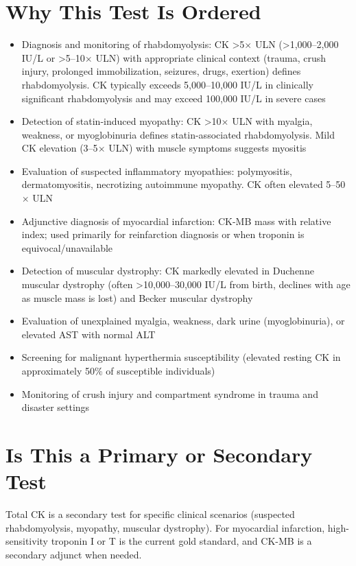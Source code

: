 \section*{Why This Test Is Ordered}
\begin{itemize}
  \item Diagnosis and monitoring of rhabdomyolysis: CK >5$\times$ ULN (>1,000--2,000 IU/L or >5--10$\times$ ULN) with appropriate clinical context (trauma, crush injury, prolonged immobilization, seizures, drugs, exertion) defines rhabdomyolysis. CK typically exceeds 5,000--10,000 IU/L in clinically significant rhabdomyolysis and may exceed 100,000 IU/L in severe cases
  \item Detection of statin-induced myopathy: CK >10$\times$ ULN with myalgia, weakness, or myoglobinuria defines statin-associated rhabdomyolysis. Mild CK elevation (3--5$\times$ ULN) with muscle symptoms suggests myositis
  \item Evaluation of suspected inflammatory myopathies: polymyositis, dermatomyositis, necrotizing autoimmune myopathy. CK often elevated 5--50$\times$ ULN
  \item Adjunctive diagnosis of myocardial infarction: CK-MB mass with relative index; used primarily for reinfarction diagnosis or when troponin is equivocal/unavailable
  \item Detection of muscular dystrophy: CK markedly elevated in Duchenne muscular dystrophy (often >10,000--30,000 IU/L from birth, declines with age as muscle mass is lost) and Becker muscular dystrophy
  \item Evaluation of unexplained myalgia, weakness, dark urine (myoglobinuria), or elevated AST with normal ALT
  \item Screening for malignant hyperthermia susceptibility (elevated resting CK in approximately 50\% of susceptible individuals)
  \item Monitoring of crush injury and compartment syndrome in trauma and disaster settings
\end{itemize}

\section*{Is This a Primary or Secondary Test}
Total CK is a secondary test for specific clinical scenarios (suspected rhabdomyolysis, myopathy, muscular dystrophy). For myocardial infarction, high-sensitivity troponin I or T is the current gold standard, and CK-MB is a secondary adjunct when needed.

